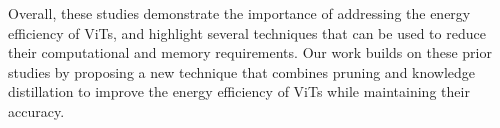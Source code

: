 Overall, these studies demonstrate the importance of addressing the energy efficiency of ViTs, and highlight several techniques that can be used to reduce their computational and memory requirements. Our work builds on these prior studies by proposing a new technique that combines pruning and knowledge distillation to improve the energy efficiency of ViTs while maintaining their accuracy.